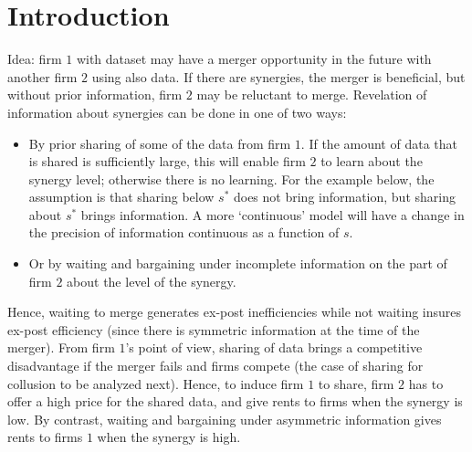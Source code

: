\documentclass[a4paper]{article}
\begin{document}
\section{Introduction}
Idea: firm $1$ with dataset may have a merger opportunity in the future with another firm $2$ using also data. If there are synergies, the merger is beneficial, but without prior information, firm $2$ may be reluctant to merge. Revelation of information about synergies can be done in one of two ways:
\begin{itemize}
  \item By prior sharing of some of the data from firm $1$. If the amount of data that is shared is sufficiently large, this will enable firm $2$ to learn about the synergy level; otherwise there is no learning. For the example below, the assumption is that sharing below $s^*$ does not bring information, but sharing about $s^*$ brings information. A more `continuous' model will have a change in the precision of information continuous as a function of $s$.
  \item Or by waiting and bargaining under incomplete information on the part of firm $2$ about the level of the synergy. 
\end{itemize}
Hence, waiting to merge generates ex-post inefficiencies while not waiting insures ex-post efficiency (since there is symmetric information at the time of the merger). From firm $1$'s point of view, sharing of data brings a competitive disadvantage if the merger fails and firms compete (the case of sharing for collusion to be analyzed next). Hence, to induce firm $1$ to share, firm $2$ has to offer a high price for the shared data, and give rents to firms when the synergy is low. By contrast, waiting and bargaining under asymmetric information gives rents to firms $1$ when the synergy is high.
\end{document}
